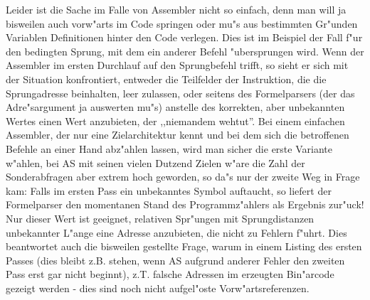 \documentclass[12pt,a4paper,twoside]{report}
\newcommand{\asname}{AS}
\begin{document}
Leider ist die Sache im Falle von Assembler nicht so einfach, denn man
will ja bisweilen auch vorw"arts im Code springen oder mu"s aus bestimmten
Gr"unden Variablen Definitionen hinter den Code verlegen.  Dies ist
im Beispiel der Fall f"ur den bedingten Sprung, mit dem ein anderer
Befehl "ubersprungen wird.  Wenn der Assembler im ersten Durchlauf auf
den Sprungbefehl trifft, so sieht er sich mit der Situation konfrontiert,
entweder die Teilfelder der Instruktion, die die Sprungadresse beinhalten,
leer zulassen, oder seitens des Formelparsers (der das Adre"sargument ja
auswerten mu"s) anstelle des korrekten, aber unbekannten Wertes einen Wert
anzubieten, der ,,niemandem wehtut''.  Bei einem einfachen Assembler, der
nur eine Zielarchitektur kennt und bei dem sich die betroffenen Befehle
an einer Hand abz"ahlen lassen, wird man sicher die erste Variante w"ahlen,
bei \asname{} mit seinen vielen Dutzend Zielen w"are die Zahl der Sonderabfragen
aber extrem hoch geworden, so da"s nur der zweite Weg in Frage kam: Falls
im ersten Pass ein unbekanntes Symbol auftaucht, so liefert der Formelparser
den momentanen Stand des Programmz"ahlers als Ergebnis zur"uck!  Nur dieser
Wert ist geeignet, relativen Spr"ungen mit Sprungdistanzen unbekannter
L"ange eine Adresse anzubieten, die nicht zu Fehlern f"uhrt.  Dies beantwortet
auch die bisweilen gestellte Frage, warum in einem Listing des ersten
Passes (dies bleibt z.B. stehen, wenn \asname{} aufgrund anderer Fehler den
zweiten Pass erst gar nicht beginnt), z.T. falsche Adressen im erzeugten
Bin"arcode gezeigt werden - dies sind noch nicht aufgel"oste
Vorw"artsreferenzen.
\end{document}
